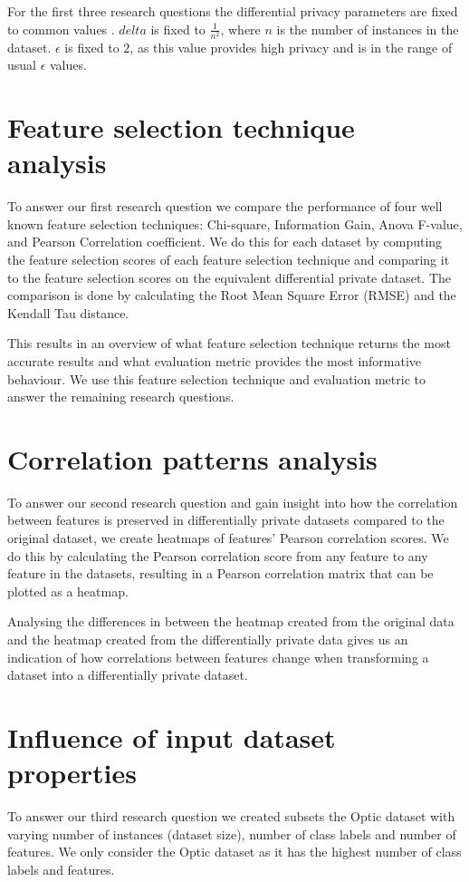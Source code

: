 For the first three research questions the differential privacy parameters are fixed to common values \cite{dpparams}. $delta$ is fixed to $\frac{1}{n^2}$, where $n$ is the number of instances in the dataset. $\epsilon$ is fixed to $2$, as this value provides high privacy and is in the range of usual $\epsilon$ values. 

\section{Feature selection technique analysis}
To answer our first research question we compare the performance of four well known feature selection techniques: Chi-square, Information Gain, Anova F-value, and Pearson Correlation coefficient. We do this for each dataset by computing the feature selection scores of each feature selection technique and comparing it to the feature selection scores on the equivalent differential private dataset. The comparison is done by calculating the Root Mean Square Error (RMSE) and the Kendall Tau distance.

This results in an overview of what feature selection technique returns the most accurate results and what evaluation metric provides the most informative behaviour. We use this feature selection technique and evaluation metric to answer the remaining research questions.

\section{Correlation patterns analysis}
To answer our second research question and gain insight into how the correlation between features is preserved in differentially private datasets compared to the original dataset, we create heatmaps of features' Pearson correlation scores. We do this by calculating the Pearson correlation score from any feature to any feature in the datasets, resulting in a Pearson correlation matrix that can be plotted as a heatmap.

Analysing the differences in between the heatmap created from the original data and the heatmap created from the differentially private data gives us an indication of how correlations between features change when transforming a dataset into a differentially private dataset.

\section{Influence of input dataset properties}
To answer our third research question we created subsets the Optic dataset with varying number of instances (dataset size), number of class labels and number of features. We only consider the Optic dataset as it has the highest number of class labels and features.

